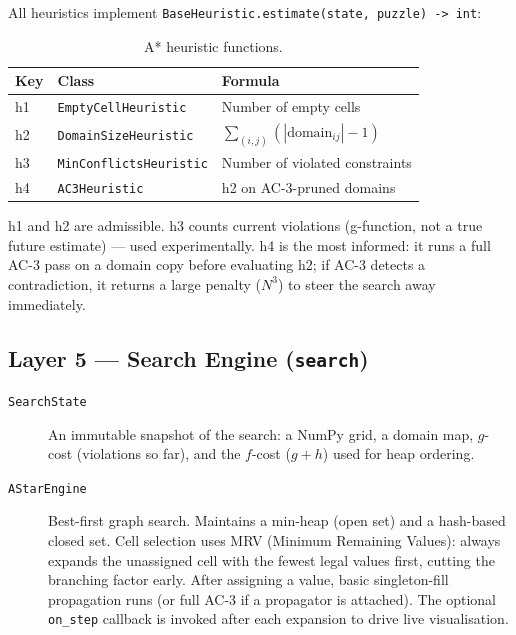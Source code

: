 All heuristics implement \texttt{BaseHeuristic.estimate(state, puzzle) -> int}:

\begin{table}[h]
  \centering
  \caption{A* heuristic functions.}
  \label{tab:heuristics}
  \begin{tabular}{lll}
    \toprule
    Key & Class & Formula \\
    \midrule
    h1 & \texttt{EmptyCellHeuristic}    & Number of empty cells \\
    h2 & \texttt{DomainSizeHeuristic}   & $\sum_{(i,j)} (|\text{domain}_{ij}| - 1)$ \\
    h3 & \texttt{MinConflictsHeuristic} & Number of violated constraints \\
    h4 & \texttt{AC3Heuristic}          & h2 on AC-3-pruned domains \\
    \bottomrule
  \end{tabular}
\end{table}

h1 and h2 are admissible.
h3 counts current violations (g-function, not a true future estimate) —
used experimentally.
h4 is the most informed: it runs a full AC-3 pass on a domain copy before
evaluating h2; if AC-3 detects a contradiction, it returns a large penalty
($N^3$) to steer the search away immediately.

\subsection{Layer 5 — Search Engine (\texttt{search})}
\label{sec:layer_search}

\begin{description}
  \item[\texttt{SearchState}] An immutable snapshot of the search:
    a NumPy grid, a domain map, $g$-cost (violations so far), and the
    $f$-cost ($g + h$) used for heap ordering.

  \item[\texttt{AStarEngine}] Best-first graph search.
    Maintains a min-heap (open set) and a hash-based closed set.
    Cell selection uses MRV (Minimum Remaining Values): always expands the
    unassigned cell with the fewest legal values first, cutting the
    branching factor early.
    After assigning a value, basic singleton-fill propagation runs (or full
    AC-3 if a propagator is attached).
    The optional \texttt{on\_step} callback is invoked after each expansion
    to drive live visualisation.
\end{description}

